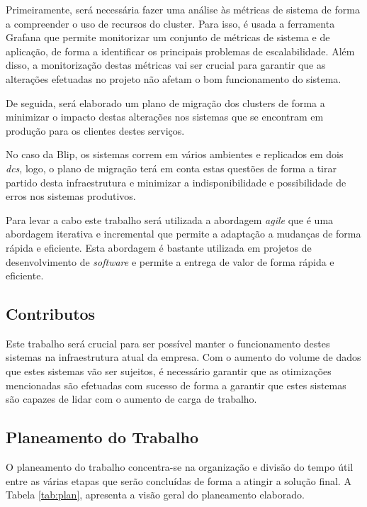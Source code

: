 Primeiramente, será necessária fazer uma análise às métricas de sistema de forma a compreender
o uso de recursos do \gls{cluster}. Para isso, é usada a ferramenta Grafana que permite
monitorizar um conjunto de métricas de sistema e de aplicação, de forma a identificar os principais
problemas de escalabilidade. Além disso, a monitorização destas métricas vai ser crucial para
garantir que as alterações efetuadas no projeto não afetam o bom funcionamento do sistema.

De seguida, será elaborado um plano de migração dos \glspl{cluster} de forma a minimizar o 
impacto destas alterações nos sistemas que se encontram em produção para os clientes destes serviços.

No caso da Blip, os sistemas correm em vários ambientes e replicados em dois \textit{\glspl{dc}},
logo, o plano de migração terá em conta estas questões de forma a tirar partido desta infraestrutura
e minimizar a indisponibilidade e possibilidade de erros nos sistemas produtivos.

Para levar a cabo este trabalho será utilizada a abordagem \textit{agile} que é uma abordagem
iterativa e incremental que permite a adaptação a mudanças de forma rápida e eficiente. Esta abordagem
é bastante utilizada em projetos de desenvolvimento de \textit{software} e permite a entrega de valor
de forma rápida e eficiente.

\subsection{Contributos}

Este trabalho será crucial para ser possível manter o funcionamento destes sistemas na
infraestrutura atual da empresa. Com o aumento do volume de dados que estes sistemas vão ser 
sujeitos, é necessário garantir que as otimizações mencionadas são efetuadas com sucesso de forma
a garantir que estes sistemas são capazes de lidar com o aumento de carga de trabalho.

\subsection{Planeamento do Trabalho}

O planeamento do trabalho concentra-se na organização e divisão do tempo útil entre as várias etapas
que serão concluídas de forma a atingir a solução final. A Tabela \ref{tab:plan}, apresenta a visão
geral do planeamento elaborado.

